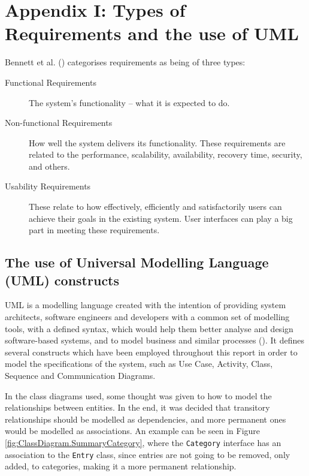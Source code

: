 \section{Appendix I: Types of Requirements and the use of UML} \label{appendix1}

Bennett et al.
(\citeyear[][pp.~140-142]{bennett2010object}) categorises requirements as being
of three types:

\begin{description} \item[Functional Requirements]
    The system's functionality -- what it is expected to do.
    
  \item[Non-functional Requirements]
    How well the system delivers its functionality. These requirements are
    related to the performance, scalability, availability, recovery time,
    security, and others.

  \item[Usability Requirements]
    These relate to how effectively, efficiently and satisfactorily users can
    achieve their goals in the existing system. User interfaces can play a big
    part in meeting these requirements.
\end{description}

\subsection{The use of Universal Modelling Language (UML) constructs}
\label{sec:Introduction.methodology.uml}

UML is a modelling language created with the intention of providing system
architects, software engineers and developers with a common set of modelling
tools, with a defined syntax, which would help them better analyse and design
software-based systems, and to model business and similar processes
(\cite[][p.~43]{omg2015uml}). It defines several constructs which have been
employed throughout this report in order to model the specifications of the
system, such as Use Case, Activity, Class, Sequence and Communication Diagrams.  

In the class diagrams used, some thought was given to how to model the
relationships between entities. In the end, it was decided that transitory
relationships should be modelled as dependencies, and more permanent ones would
be modelled as associations. An example can be seen in Figure
\ref{fig:ClassDiagram.SummaryCategory}, where the \texttt{Category} interface
has an association to the \texttt{Entry} class, since entries are not going to
be removed, only added, to categories, making it a more permanent relationship.


